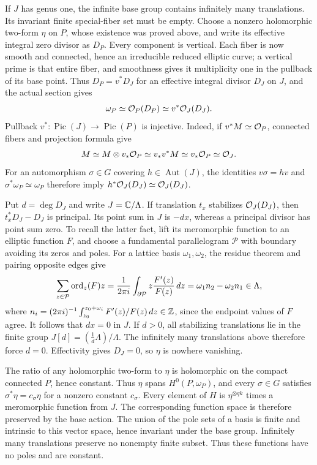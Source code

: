 If \(J\) has genus one, the infinite base group contains infinitely many
translations.  Its invariant finite special-fiber set must be empty.
Choose a nonzero holomorphic two-form \(\eta\) on \(P\), whose existence
was proved above, and write its effective integral zero divisor as
\(D_P\).  Every component is vertical.  Each fiber is now smooth and
connected, hence an irreducible reduced elliptic curve; a vertical prime
is that entire fiber, and smoothness gives it multiplicity one in the
pullback of its base point.  Thus \(D_P=v^*D_J\) for an effective integral
divisor \(D_J\) on \(J\), and the actual section gives
\[
 \omega_P\simeq\mathcal O_P(D_P)\simeq v^*\mathcal O_J(D_J).
\]
Pullback \(v^*:\operatorname{Pic}(J)\to\operatorname{Pic}(P)\) is
injective.  Indeed, if \(v^*M\simeq\mathcal O_P\), connected fibers and
projection formula give
\[
 M\simeq M\otimes v_*\mathcal O_P\simeq v_*v^*M\simeq v_*\mathcal O_P\simeq\mathcal O_J.
\]
For an automorphism \(\sigma\in G\) covering \(h\in\operatorname{Aut}(J)\),
the identities \(v\sigma=hv\) and \(\sigma^*\omega_P\simeq\omega_P\)
therefore imply \(h^*\mathcal O_J(D_J)\simeq\mathcal O_J(D_J)\).

Put \(d=\deg D_J\) and write \(J=\mathbb C/\Lambda\).  If translation \(t_x\)
stabilizes \(\mathcal O_J(D_J)\), then \(t_x^*D_J-D_J\) is principal.  Its
point sum in \(J\) is \(-dx\), whereas a principal divisor has point
sum zero.  To recall the latter fact, lift its meromorphic function to
an elliptic function \(F\), and choose a fundamental parallelogram
\(\mathcal P\) with boundary avoiding its zeros and poles.  For a lattice
basis \(\omega_1,\omega_2\), the residue theorem and pairing opposite
edges give
\[
 \sum_{z\in\mathcal P}\operatorname{ord}_z(F)z
 =\frac{1}{2\pi i}\int_{\partial\mathcal P}z\frac{F'(z)}{F(z)}\,dz
 =\omega_1 n_2-\omega_2 n_1\in\Lambda,
\]
where \(n_i=(2\pi i)^{-1}\int_{z_0}^{z_0+\omega_i}F'(z)/F(z)\,dz\in\mathbb Z\), since
the endpoint values of \(F\) agree.  It follows that \(dx=0\) in \(J\).
If \(d>0\), all stabilizing translations lie in the finite group
\(J[d]=(\tfrac1d\Lambda)/\Lambda\).  The infinitely many translations
above therefore force \(d=0\).  Effectivity gives \(D_J=0\), so \(\eta\)
is nowhere vanishing.

The ratio of any holomorphic two-form to \(\eta\) is holomorphic on the
compact connected \(P\), hence constant.  Thus \(\eta\) spans
\(H^0(P,\omega_P)\), and every \(\sigma\in G\) satisfies
\(\sigma^*\eta=c_\sigma\eta\) for a nonzero constant \(c_\sigma\).
Every element of \(H\) is \(\eta^{\otimes qk}\)
times a meromorphic function from \(J\).  The corresponding function
space is therefore preserved by the base action.  The union of the pole sets of
a basis is finite and intrinsic to this vector space, hence invariant
under the base group.  Infinitely many translations preserve no nonempty
finite subset.  Thus these functions have no poles and are constant.


